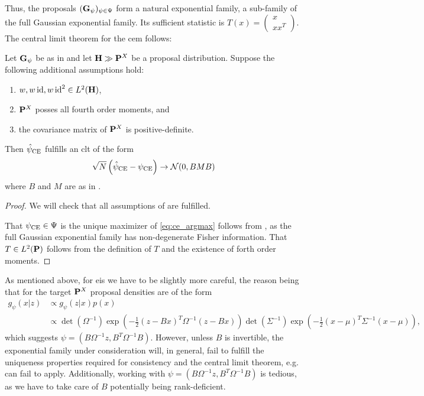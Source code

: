 Thus, the proposals $(\G_{\psi})_{\psi \in \Psi}$ form a natural exponential family, a sub-family of the full Gaussian exponential family. Its sufficient statistic is $T(x) = \begin{pmatrix}
    x \\ xx^{T}
\end{pmatrix}$. The central limit theorem for the \gls{cem} follows:

\begin{theorem}
    \label{thm:cem_clt_ssm}
    Let $\G_{\psi}$ be as in  and let $\H \gg \P^{X}$ be a proposal distribution. Suppose the following additional assumptions hold:
    \begin{enumerate}
        \item $w, w\id, w\id^2 \in L^{2}(\H)$,
        \item $\P^{X}$ posses all fourth order moments, and
        \item the covariance matrix of $\P^{X}$ is positive-definite.
    \end{enumerate}
    
    Then $\hpce$ fulfills an \gls{clt} of the form 
    $$
        \sqrt{N} \left(\hpce - \pce \right) \to \mathcal N(0, BMB)
    $$
    where $B$ and $M$ are as in .
\end{theorem}

\begin{proof}
    We will check that all assumptions of  are fulfilled. 

    That $\pce\in\Psi$ is the unique maximizer of \eqref{eq:ce_argmax} follows from , as the full Gaussian exponential family has non-degenerate Fisher information. That $T \in L^{2} (\P)$ follows from the definition of $T$ and the existence of forth order moments.
\end{proof}


As mentioned above, for \gls{eis} we have to be slightly more careful, the reason being that for the target $\P^{X}$ proposal densities are of the form 
\begin{align*}
    g_{\psi}(x|z) &\propto g_{\psi}(z|x) p(x) \\
    &\propto \det(\Omega^{-1}) \exp \left( - \frac{1}{2} (z-Bx)^{T}\Omega^{-1}(z - Bx) \right) \det (\Sigma^{-1}) \exp \left( - \frac{1}{2}(x - \mu)^{T}\Sigma^{-1} (x - \mu) \right),
\end{align*}
which suggests $\psi = \left( B\Omega ^{-1}z, B^{T}\Omega^{-1}B \right)$. However, unless $B$ is invertible, the exponential family under consideration will, in general, fail to fulfill the uniqueness properties required for consistency and the central limit theorem, e.g.  can fail to apply. Additionally, working with $\psi = \left( B\Omega ^{-1}z, B^{T}\Omega^{-1}B \right)$ is tedious, as we have to take care of $B$ potentially being rank-deficient. 

